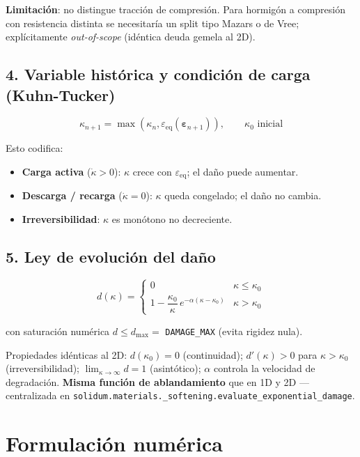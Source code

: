 \documentclass[11pt,letterpaper,oneside]{report}
\begin{document}
\textbf{Limitación}: no distingue tracción de compresión. Para hormigón a compresión con resistencia distinta se necesitaría un split tipo Mazars o de Vree; explícitamente \textit{out-of-scope} (idéntica deuda gemela al 2D).

\subsection{4. Variable histórica y condición de carga (Kuhn-Tucker)}

\[
\kappa_{n+1} = \max(\kappa_n, \varepsilon_\text{eq}(\boldsymbol\varepsilon_{n+1})), \qquad \kappa_0 \text{ inicial}
\]

Esto codifica:

\begin{itemize}
  \item \textbf{Carga activa} ($\dot\kappa > 0$): $\kappa$ crece con $\varepsilon_\text{eq}$; el daño puede aumentar.
  \item \textbf{Descarga / recarga} ($\dot\kappa = 0$): $\kappa$ queda congelado; el daño no cambia.
  \item \textbf{Irreversibilidad}: $\kappa$ es monótono no decreciente.
\end{itemize}

\subsection{5. Ley de evolución del daño}

\[
d(\kappa) = \begin{cases}
0 & \kappa \leq \kappa_0 \\
1 - \dfrac{\kappa_0}{\kappa}\,e^{-\alpha(\kappa - \kappa_0)} & \kappa > \kappa_0
\end{cases}
\]

con saturación numérica $d \leq d_\text{max} = $ \texttt{DAMAGE\_MAX} (evita rigidez nula).

Propiedades idénticas al 2D: $d(\kappa_0) = 0$ (continuidad); $d'(\kappa) > 0$ para $\kappa > \kappa_0$ (irreversibilidad); $\lim_{\kappa \to \infty} d = 1$ (asintótico); $\alpha$ controla la velocidad de degradación. \textbf{Misma función de ablandamiento} que en 1D y 2D --- centralizada en \texttt{solidum.materials.\_softening.evaluate\_exponential\_damage}.


\section{Formulación numérica}
\end{document}

